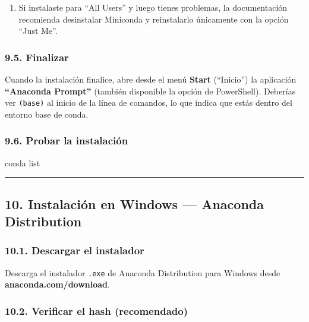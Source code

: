 \documentclass[
  doc,
  floatsintext,
  longtable,
  a4paper,
  nolmodern,
  notxfonts,
  notimes,
  12pt,
  colorlinks=true,linkcolor=blue,citecolor=blue,urlcolor=blue]{apa7}
\newenvironment{Shaded}{\begin{snugshade}}{\end{snugshade}}
\newcommand{\NormalTok}[1]{\textcolor[rgb]{0.00,0.23,0.31}{#1}}
\providecommand{\tightlist}{%
  \setlength{\itemsep}{0pt}\setlength{\parskip}{0pt}}
\begin{document}
\begin{enumerate}
\def\labelenumi{\arabic{enumi}.}
\setcounter{enumi}{4}
\tightlist
\item
  Si instalaste para ``All Users'' y luego tienes problemas, la
  documentación recomienda desinstalar Miniconda y reinstalarlo
  únicamente con la opción ``Just Me''.
\end{enumerate}

\subsubsection{9.5. Finalizar}\label{finalizar}

Cuando la instalación finalice, abre desde el menú \textbf{Start}
(``Inicio'') la aplicación \textbf{``Anaconda Prompt''} (también
disponible la opción de PowerShell). Deberías ver \texttt{(base)} al
inicio de la línea de comandos, lo que indica que estás dentro del
entorno base de conda.

\subsubsection{9.6. Probar la
instalación}\label{probar-la-instalaciuxf3n-1}

\begin{Shaded}
\begin{Highlighting}[]
\NormalTok{conda list}
\end{Highlighting}
\end{Shaded}

\begin{center}\rule{0.5\linewidth}{0.5pt}\end{center}

\subsection{10. Instalación en Windows --- Anaconda
Distribution}\label{instalaciuxf3n-en-windows-anaconda-distribution}

\subsubsection{10.1. Descargar el
instalador}\label{descargar-el-instalador-3}

Descarga el instalador \texttt{.exe} de Anaconda Distribution para
Windows desde \textbf{anaconda.com/download}.

\subsubsection{10.2. Verificar el hash
(recomendado)}\label{verificar-el-hash-recomendado-3}
\end{document}
